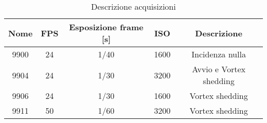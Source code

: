 \begin{table}[h]
\centering
\begin{tabular}{|c|c|c|c|c|}
\hline
Nome & FPS & Esposizione frame [s] & ISO  & Descrizione \\
\hline
9900 & 24  & 1/40            & 1600 & Incidenza nulla\\
\hline
9904 & 24  & 1/30            & 3200 & Avvio e Vortex shedding \\
\hline
9906 & 24  & 1/30            & 1600 & Vortex shedding \\
\hline
9911 & 50  & 1/60            & 3200 & Vortex shedding \\
\hline
\end{tabular}
\caption{Descrizione acquisizioni}
\label{tab: Acquisizioni}
\end{table}


